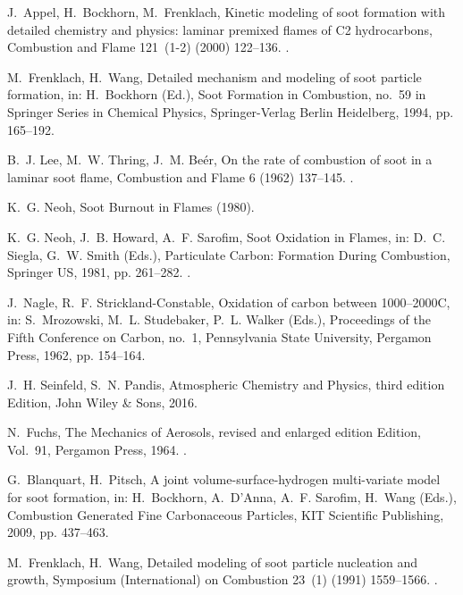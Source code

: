 \documentclass[preprint,letterpaper]{elsarticle}
\begin{document}
\begin{thebibliography}{00}
J.~Appel, H.~Bockhorn, M.~Frenklach, {Kinetic modeling of soot formation with
detailed chemistry and physics: laminar premixed flames of C2 hydrocarbons},
{Combustion and Flame} 121~(1-2) (2000) 122--136.
\newblock \href {http://dx.doi.org/10.1016/S0010-2180(99)00135-2}
  {}.

M.~Frenklach, H.~Wang, {Detailed mechanism and modeling of soot particle
formation}, in: H.~Bockhorn (Ed.), {Soot Formation in Combustion}, no.~59 in
{Springer Series in Chemical Physics}, {Springer-Verlag Berlin Heidelberg},
1994, pp. 165--192.

B.~J. Lee, M.~W. Thring, J.~M. Be{\'e}r, {On the rate of combustion of soot in
a laminar soot flame}, {Combustion and Flame} 6 (1962) 137--145.
\newblock \href {http://dx.doi.org/10.1016/0010-2180(62)90082-2}
  {}.

K.~G. Neoh, {Soot Burnout in Flames} (1980).

K.~G. Neoh, J.~B. Howard, A.~F. Sarofim, {Soot Oxidation in Flames}, in: D.~C.
Siegla, G.~W. Smith (Eds.), {Particulate Carbon: Formation During
Combustion}, {Springer US}, 1981, pp. 261--282.
\newblock \href {http://dx.doi.org/10.1007/978-1-4757-6137-5_9}
  {}.

J.~Nagle, R.~F. Strickland-Constable, {Oxidation of carbon between
1000--2000C}, in: S.~Mrozowski, M.~L. Studebaker, P.~L. Walker (Eds.),
{Proceedings of the Fifth Conference on Carbon}, no.~1, {Pennsylvania State
University}, {Pergamon Press}, 1962, pp. 154--164.

J.~H. Seinfeld, S.~N. Pandis, {Atmospheric Chemistry and Physics}, third
edition Edition, {John Wiley {\&} Sons}, 2016.

N.~Fuchs, {The Mechanics of Aerosols}, revised and enlarged edition Edition,
Vol.~91, {Pergamon Press}, 1964.
\newblock \href {http://dx.doi.org/10.1002/qj.49709138822}
  {}.

G.~Blanquart, H.~Pitsch, {A joint volume-surface-hydrogen multi-variate model
for soot formation}, in: H.~Bockhorn, A.~D'Anna, A.~F. Sarofim, H.~Wang
(Eds.), {Combustion Generated Fine Carbonaceous Particles}, {KIT Scientific
Publishing}, 2009, pp. 437--463.

M.~Frenklach, H.~Wang, {Detailed modeling of soot particle nucleation and
growth}, {Symposium (International) on Combustion} 23~(1) (1991) 1559--1566.
\newblock \href {http://dx.doi.org/10.1016/S0082-0784(06)80426-1}
  {}.


\end{thebibliography}
\end{document}
